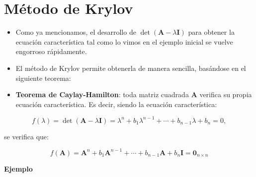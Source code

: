 \documentclass[openany]{book}
\begin{document}
\hypertarget{muxe9todo-de-krylov}{%
\section{Método de Krylov}\label{muxe9todo-de-krylov}}

\begin{itemize}
\item
  Como ya mencionamos, el desarrollo de \(\det(\textbf{A} - \lambda \textbf{I})\) para obtener la ecuación característica tal como lo vimos en el ejemplo inicial se vuelve engorroso rápidamente.
\item
  El método de Krylov permite obtenerla de manera sencilla, basándose en el siguiente teorema:
\item
  \textbf{Teorema de Caylay-Hamilton}: toda matriz cuadrada \(\textbf{A}\) verifica su propia ecuación característica. Es decir, siendo la ecuación característica:
\end{itemize}

\[
f(\lambda) = \det(\textbf{A} - \lambda \textbf{I}) = \lambda^n + b_1 \lambda^{n-1} + \cdots + b_{n-1} \lambda + b_n = 0,
\]

se verifica que:

\[
f(\textbf{A}) = \textbf{A}^n + b_1 \textbf{A}^{n-1} + \cdots + b_{n-1} \textbf{A} + b_n \textbf{I} = \textbf{0}_{n\times n}
\]

\textbf{Ejemplo}
\end{document}
